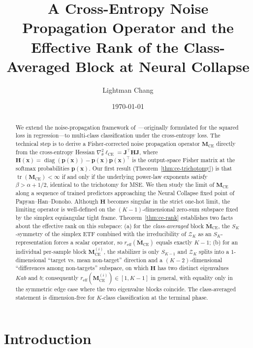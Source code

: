 \documentclass[12pt]{amsart}
\title[Cross-Entropy Noise Propagation and Neural Collapse]{%
  A Cross-Entropy Noise Propagation Operator and the\\
  Effective Rank of the Class-Averaged Block at Neural Collapse}
\author{Lightman Chang}
\date{\today}
\theoremstyle{definition}
\theoremstyle{remark}
\DeclareMathOperator{\tr}{tr}
\DeclareMathOperator{\diag}{diag}
\newcommand{\bx}{\mathbf{x}}
\newcommand{\bJ}{\mathbf{J}}
\newcommand{\bM}{\mathbf{M}}
\newcommand{\bp}{\mathbf{p}}
\newcommand{\bH}{\mathbf{H}}
\begin{document}
\begin{abstract}
We extend the noise-propagation framework
of~\cite{paperA}---originally formulated for the squared loss in
regression---to multi-class classification under the cross-entropy
loss. The technical step is to derive a Fisher-corrected noise
propagation operator $\bM_{\mathrm{CE}}$ directly from the
cross-entropy Hessian
$\nabla_{\theta}^{2}\ell_{\mathrm{CE}} = \bJ^{\top}\bH\bJ$, where
$\bH(\bx) = \diag(\bp(\bx)) - \bp(\bx)\bp(\bx)^{\top}$ is the
output-space Fisher matrix at the softmax probabilities $\bp(\bx)$.
Our first result (Theorem~\ref{thm:ce-trichotomy}) is that
$\tr(\bM_{\mathrm{CE}}) < \infty$ if and only if the underlying
power-law exponents satisfy $\beta > \alpha + 1/2$, identical to the
trichotomy for MSE. We then study the limit of $\bM_{\mathrm{CE}}$
along a sequence of trained predictors approaching the Neural
Collapse fixed point of Papyan--Han--Donoho. Although
$\bH$ becomes singular in the strict one-hot limit, the limiting
operator is well-defined on the $(K-1)$-dimensional zero-sum
subspace fixed by the simplex equiangular tight frame.
Theorem~\ref{thm:ce-rank} establishes two facts about the
effective rank on this subspace: (a) for the
\emph{class-averaged} block $\overline{\bM}_{\mathrm{CE}}$, the
$S_{K}$-symmetry of the simplex ETF combined with the irreducibility
of $\mathcal{Z}_{K}$ as an $S_{K}$-representation forces a scalar
operator, so $r_{\mathrm{eff}}(\overline{\bM}_{\mathrm{CE}})$ equals
exactly $K-1$; (b) for an individual per-sample block
$\bM_{\mathrm{CE}}^{(i)}$, the stabilizer is only $S_{K-1}$ and
$\mathcal{Z}_{K}$ splits into a $1$-dimensional ``target vs. mean
non-target'' direction and a $(K-2)$-dimensional ``differences among
non-targets'' subspace, on which $\bH$ has two distinct eigenvalues
$Ka b$ and $b$; consequently $r_{\mathrm{eff}}(\bM_{\mathrm{CE}}^{(i)})
\in [1, K-1]$ in general, with equality only in the symmetric
edge case where the two eigenvalue blocks coincide.
The class-averaged statement is dimension-free for
$K$-class classification at the terminal phase.
\end{abstract}

\maketitle

\section{Introduction}\label{sec:intro}
\end{document}
